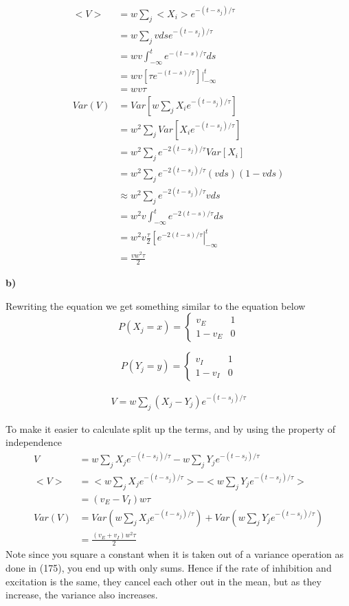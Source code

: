 \documentclass{article}
\begin{document}
\begin{align}
    <V> &= w \sum_{j} <X_i> e^{-(t-s_j)/\tau}\\
    &= w \sum_{j} vds e^{-(t-s_j)/\tau}\\
    &= wv \int_{-\infty}^{t}e^{-(t-s)/\tau}ds\\
    &= wv \left[\tau e^{-(t-s)/\tau}\right]|_{-\infty}^t\\
    &=wv\tau\\
    Var(V) &= Var\left[w\sum_{j} X_i e^{-(t-s_j)/\tau}\right]\\
    &= w^2\sum_{j} Var\left[X_i e^{-(t-s_j)/\tau}\right]\\
    &= w^2\sum_{j} e^{-2(t-s_j)/\tau}Var\left[X_i \right]\\
    &= w^2\sum_{j} e^{-2(t-s_j)/\tau}(vds)(1-vds)\\
    &\approx w^2\sum_{j} e^{-2(t-s_j)/\tau}vds\\
    &= w^2v\int_{-\infty}^t e^{-2(t-s)/\tau}ds\\
    &= w^2v\frac{\tau}{2}  \left[e^{-2(t-s)/\tau}\right|_{-\infty}^t\\
    &= \frac{vw^2\tau}{2}
\end{align}

\textbf{b)} 

Rewriting the equation we get something similar to the equation below 
\[
P(X_j = x) = \begin{cases}
    v_E & 1\\
    1-v_E & 0
\end{cases}
\]

\[
P(Y_j = y) = \begin{cases}
    v_I & 1\\
    1-v_I & 0
\end{cases}
\]

\begin{align}
    V = w \sum_{j} (X_j - Y_j) e^{-(t-s_j)/\tau}
\end{align}

To make it easier to calculate split up the terms, and by using the property of independence
\begin{align}
    V &= w \sum_{j} X_j e^{-(t-s_j)/\tau} -w \sum_{j} Y_je^{-(t-s_j)/\tau}\\
    <V> &= <w \sum_{j} X_j e^{-(t-s_j)/\tau}> - <w \sum_{j} Y_je^{-(t-s_j)/\tau}>\\
    &= (v_E-V_I)w\tau\\
    Var(V) &= Var(w \sum_{j} X_j e^{-(t-s_j)/\tau}) + Var(w \sum_{j} Y_je^{-(t-s_j)/\tau})\\
    &= \frac{(v_E+v_I)w^2\tau}{2}
\end{align}
Note since you square a constant when it is taken out of a variance operation as done in (175), you end up with only sums.
Hence if the rate of inhibition and excitation is the same, they cancel each other out in the mean, but
as they increase, the variance also increases.
\end{document}
